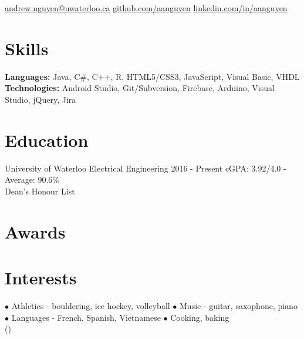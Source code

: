 \documentclass[]{aanguyen_res}
\begin{document}
	\begin{sidebar}%
		\vspace{35pt}%
			\iconentry{\faEnvelope}\href{mailto:andrew.nguyen@uwaterloo.ca}{andrew.nguyen@uwaterloo.ca}
			\iconentry{\faGithub}\href{http://github.com/aanguyen}{github.com/aanguyen}
			\iconentry{\faLinkedin}\href{http://www.linkedin.com/in/aanguyen}{linkedin.com/in/aanguyen}
			\vspace{0.75cm}%
		\section{Skills}
			\textbf{Languages: }Java, C\#, C++, R, HTML5/CSS3, JavaScript, Visual Basic, VHDL
			\vspace{0.15cm}%
			\textbf{Technologies: }Android Studio, Git/Subversion, Firebase, Arduino, Visual Studio, jQuery, Jira
			\vspace{1cm}%
		\section{Education}
			\eduentry%
				{University of Waterloo}%
				{Electrical Engineering}%
				{2016 - Present}%
				{cGPA: 3.92/4.0 - Average: 90.6\%\\Dean's Honour List}
			\vspace{0.65cm}%
		\section{Awards}
			\vspace{0.65cm}%
		\section{Interests}
		$\bullet$ Athletics - bouldering, ice hockey, volleyball
		$\bullet$ Music - guitar, saxophone, piano
		$\bullet$ Languages - French, Spanish, Vietnamese
		$\bullet$ Cooking, baking\\()
	\end{sidebar}%
\end{document}
